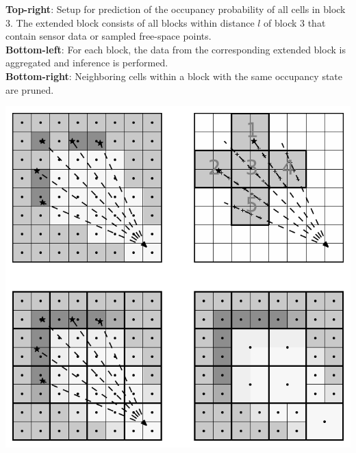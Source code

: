 \documentclass[portrait,final,archD,fontscale=0.477]{baposter}
\begin{document}
\begin{poster}
{\begin{multicols}{2}
\textbf{Top-right}: Setup for prediction of the occupancy probability of all cells in block $3$. The extended block consists of all blocks within distance $l$ of block $3$ that contain sensor data or sampled free-space points. \\

\textbf{Bottom-left}: For each block, the data from the corresponding extended block is aggregated and inference is performed. \\

\textbf{Bottom-right}: Neighboring cells within a block with the same occupancy state are pruned.

\includegraphics[width=0.9\linewidth]{img/grid_octrees_predict}

\end{multicols}

}

\end{poster}
\end{document}
